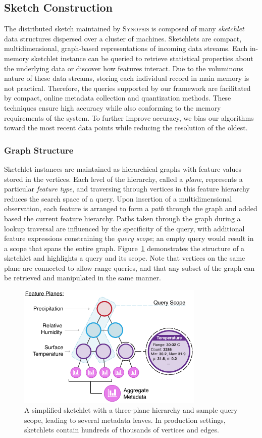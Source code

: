 \subsection{Sketch Construction}
\label{sec:sketch}
The distributed sketch maintained by \textsc{Synopsis} is composed of many \emph{sketchlet} data structures dispersed over a cluster of machines. Sketchlets are compact, multidimensional, graph-based representations of incoming data streams. Each in-memory sketchlet instance can be queried to retrieve statistical properties about the underlying data or discover how features interact. Due to the voluminous nature of these data streams, storing each individual record in main memory is not practical. Therefore, the queries supported by our framework are facilitated by compact, online metadata collection and quantization methods. These techniques ensure high accuracy while also conforming to the memory requirements of the system. To further improve accuracy, we bias our algorithms toward the most recent data points while reducing the resolution of the oldest.

\subsubsection{Graph Structure}
Sketchlet instances are maintained as hierarchical graphs with feature values stored in the vertices. Each level of the hierarchy, called a \emph{plane}, represents a particular \emph{feature type}, and traversing through vertices in this feature hierarchy reduces the search space of a query. Upon insertion of a multidimensional observation, each feature is arranged to form a \emph{path} through the graph and added based the current feature hierarchy. Paths taken through the graph during a lookup traversal are influenced by the specificity of the query, with additional feature expressions constraining the \emph{query scope}; an empty query would result in a scope that spans the entire graph. Figure~\ref{fig:sketch} demonstrates the structure of a sketchlet and highlights a query and its scope. Note that vertices on the same plane are connected to allow range queries, and that any subset of the graph can be retrieved and manipulated in the same manner.

\begin{figure}[b!]
    \centerline{\includegraphics[width=3.5in]{figures/sketch.pdf}}
    \caption{A simplified sketchlet with a three-plane hierarchy and sample query scope, leading to several metadata leaves. In production settings, sketchlets contain hundreds of thousands of vertices and edges.}
    \label{fig:sketch}
\end{figure}


